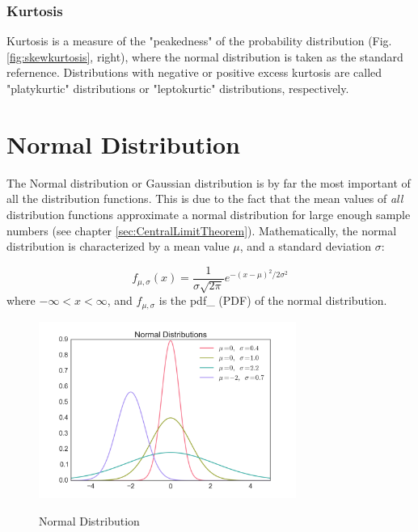 \subsubsection{Kurtosis}

Kurtosis is a measure of the "peakedness" of the probability distribution (Fig. \ref{fig:skewkurtosis}, right), where the normal distribution is taken as the standard refernence. Distributions with negative or positive excess kurtosis are called "platykurtic" distributions or "leptokurtic" distributions, respectively.

\section{Normal Distribution} \label{sec:normalDistribution}

The Normal distribution or Gaussian distribution is by far the most important of all the distribution functions. This is due to the fact that the mean values of \emph{all} distribution functions approximate a normal distribution for large enough sample numbers (see chapter \ref{sec:CentralLimitTheorem}).
Mathematically, the normal distribution is characterized by a mean value $\mu$, and a standard deviation $\sigma$:

\begin{equation}\label{eq_normal}
     f_{\mu,\sigma} (x) = \frac{1}{\sigma \sqrt{2 \pi}} e^{-( x - \mu )^2 /2 \sigma^2}
\end{equation}
where $ - \infty < x < \infty $, and $f_{\mu,\sigma}$ is the \gls{pdf_} (PDF)  of the normal distribution.

\begin{figure}
  \centering
  \includegraphics[width=0.75\textwidth]{../Images/Normal_Distribution_PDF.png}\\
  \caption{Normal Distribution}\label{fig:normal}
\end{figure}

